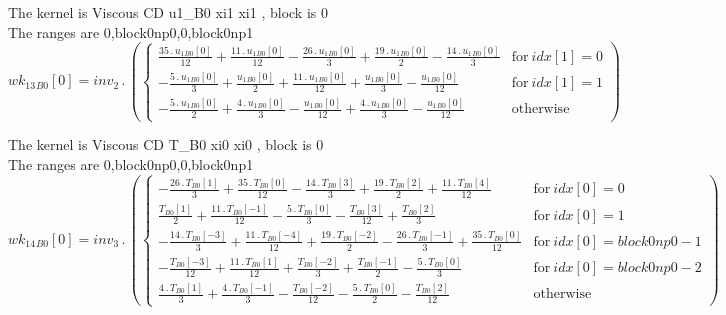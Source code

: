 \documentclass{article}
\begin{document}
\noindent The kernel is Viscous CD u1_B0 xi1 xi1 , block is 0\\\noindent The ranges are 0,block0np0,0,block0np1\\\begin{dmath}{wk_{13}{_{B0}}}[{0}] = inv_2 \,.\, \left(\begin{cases} \frac{35 \,.\, {u_{1}{_{B0}}}[{0}]}{12} + \frac{11 \,.\, {u_{1}{_{B0}}}[{0}]}{12} - \frac{26 \,.\, {u_{1}{_{B0}}}[{0}]}{3} + \frac{19 \,.\, {u_{1}{_{B0}}}[{0}]}{2} - \frac{14 \,.\, 
{u_{1}{_{B0}}}[{0}]}{3} & \text{for}\: {idx}[{1}] = 0 \\- \frac{5 \,.\, {u_{1}{_{B0}}}[{0}]}{3} + \frac{{u_{1}{_{B0}}}[{0}]}{2} + \frac{11 \,.\, {u_{1}{_{B0}}}[{0}]}{12} + \frac{{u_{1}{_{B0}}}[{0}]}{3} - \frac{{u_{1}{_{B0}}}[{0}]}{12} & \text{for}\: 
{idx}[{1}] = 1 \\- \frac{5 \,.\, {u_{1}{_{B0}}}[{0}]}{2} + \frac{4 \,.\, {u_{1}{_{B0}}}[{0}]}{3} - \frac{{u_{1}{_{B0}}}[{0}]}{12} + \frac{4 \,.\, {u_{1}{_{B0}}}[{0}]}{3} - \frac{{u_{1}{_{B0}}}[{0}]}{12} & \text{otherwise} 
\end{cases}\right)\end{dmath}

\noindent The kernel is Viscous CD T_B0 xi0 xi0 , block is 0\\\noindent The ranges are 0,block0np0,0,block0np1\\\begin{dmath}{wk_{14}{_{B0}}}[{0}] = inv_3 \,.\, \left(\begin{cases} - \frac{26 \,.\, {T{_{B0}}}[{1}]}{3} + \frac{35 \,.\, {T{_{B0}}}[{0}]}{12} - \frac{14 \,.\, {T{_{B0}}}[{3}]}{3} + \frac{19 \,.\, {T{_{B0}}}[{2}]}{2} + \frac{11 \,.\, 
{T{_{B0}}}[{4}]}{12} & \text{for}\: {idx}[{0}] = 0 \\\frac{{T{_{B0}}}[{1}]}{2} + \frac{11 \,.\, {T{_{B0}}}[{-1}]}{12} - \frac{5 \,.\, {T{_{B0}}}[{0}]}{3} - \frac{{T{_{B0}}}[{3}]}{12} + \frac{{T{_{B0}}}[{2}]}{3} & \text{for}\: {idx}[{0}] = 1 \\- 
\frac{14 \,.\, {T{_{B0}}}[{-3}]}{3} + \frac{11 \,.\, {T{_{B0}}}[{-4}]}{12} + \frac{19 \,.\, {T{_{B0}}}[{-2}]}{2} - \frac{26 \,.\, {T{_{B0}}}[{-1}]}{3} + \frac{35 \,.\, {T{_{B0}}}[{0}]}{12} & \text{for}\: {idx}[{0}] = block0np0 - 1 \\- 
\frac{{T{_{B0}}}[{-3}]}{12} + \frac{11 \,.\, {T{_{B0}}}[{1}]}{12} + \frac{{T{_{B0}}}[{-2}]}{3} + \frac{{T{_{B0}}}[{-1}]}{2} - \frac{5 \,.\, {T{_{B0}}}[{0}]}{3} & \text{for}\: {idx}[{0}] = block0np0 - 2 \\\frac{4 \,.\, {T{_{B0}}}[{1}]}{3} + \frac{4 
\,.\, {T{_{B0}}}[{-1}]}{3} - \frac{{T{_{B0}}}[{-2}]}{12} - \frac{5 \,.\, {T{_{B0}}}[{0}]}{2} - \frac{{T{_{B0}}}[{2}]}{12} & \text{otherwise} \end{cases}\right)\end{dmath}
\end{document}
